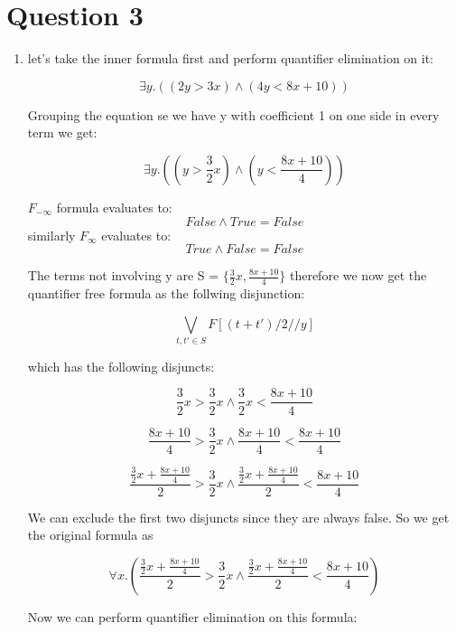 \documentclass{article}
\begin{document}
\section{Question 3}

\begin{enumerate}
    \item let's take the inner formula first and perform quantifier elimination on it:
    
    $$\exists y. ((2y > 3x) \land (4y < 8x + 10))$$

    Grouping the equation se we have y with coefficient 1 on one side in every term we get:

    $$\exists y. ((y > \frac{3}{2}x) \land (y < \frac{8x + 10}{4}))$$

    
    $F_{- \infty}$ formula evaluates to:
    $$False \land True = False$$
    similarly $F_{\infty }$ evaluates to:
    $$True \land False = False$$
    
    The terms not involving y are S = $\{\frac{3}{2}x, \frac{8x+10}{4} \}$
    therefore we now get the quantifier free formula as the follwing disjunction:

    $$\bigvee_{t,t' \in S} F[(t+t')/2//y]$$

    which has the following disjuncts:

    $$\frac{3}{2}x > \frac{3}{2}x \land \frac{3}{2}x < \frac{8x+10}{4}$$

    $$\frac{8x+10}{4} > \frac{3}{2}x \land \frac{8x+10}{4} < \frac{8x+10}{4}$$

    $$\frac{\frac{3}{2}x + \frac{8x+10}{4}}{2} > \frac{3}{2}x \land \frac{\frac{3}{2}x + \frac{8x+10}{4}}{2} < \frac{8x+10}{4}$$

    We can exclude the first two disjuncts since they are always false. So we get the original formula as

    $$\forall x. (\frac{\frac{3}{2}x + \frac{8x+10}{4}}{2} > \frac{3}{2}x \land \frac{\frac{3}{2}x + \frac{8x+10}{4}}{2} < \frac{8x+10}{4})$$

    Now we can perform quantifier elimination on this formula:
    
\end{enumerate}
\end{document}
